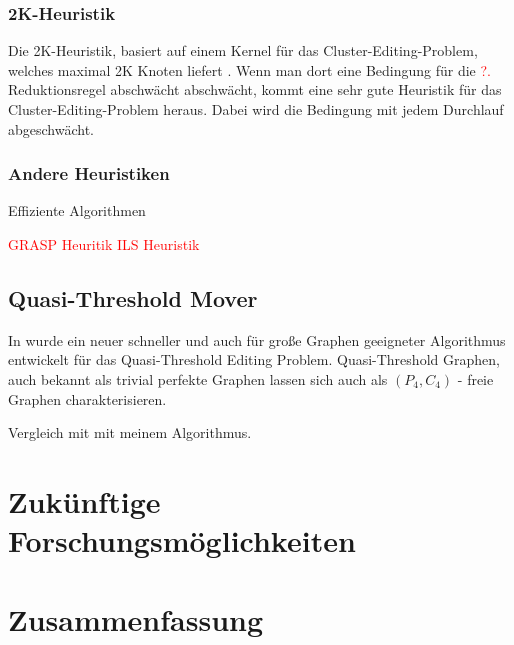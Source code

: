 \documentclass[12pt,a4paper,onecolumn,oneside,titlepage]{article}
\let\oldReturn\Return
\renewcommand{\Return}{\State\oldReturn}
\newcommand\todo[1]{\textcolor{red}{#1}}
\begin{document}
\subsubsection{2K-Heuristik}
Die 2K-Heuristik, basiert auf einem Kernel für das Cluster-Editing-Problem, welches maximal 2K Knoten liefert \cite{Chen12}. Wenn man dort eine Bedingung für die \todo{?.} Reduktionsregel abschwächt  abschwächt, kommt eine sehr gute Heuristik für das Cluster-Editing-Problem heraus. Dabei wird die Bedingung mit jedem Durchlauf abgeschwächt.
\pagebreak
\begin{center}
  \label{algo:2k}
\begin{algorithmic}[1]
			\EndFor
		\EndIf
	\EndFor
\EndWhile

\EndFunction

	\EndFor

\EndFunction
{}
	\EndFor

\EndFunction
\end{algorithmic}
\end{center}


\subsubsection{Andere Heuristiken}
\cite{Bastos2014} Effiziente Algorithmen

 \todo{GRASP Heuritik}
 \todo{ILS Heuristik}

\subsection{Quasi-Threshold Mover}
In \cite{BrandesHSW15} wurde ein neuer schneller und auch für große Graphen geeigneter Algorithmus entwickelt für das Quasi-Threshold Editing Problem. Quasi-Threshold Graphen, auch bekannt als trivial perfekte Graphen lassen sich auch als $(P_4, C_4)$ - freie Graphen charakterisieren. 


Vergleich mit mit meinem Algorithmus.


\section{Zukünftige Forschungsmöglichkeiten}
\section{Zusammenfassung}




\end{document}
